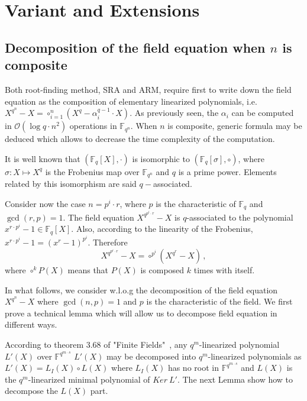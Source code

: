 \documentclass{sig-alternate}
\newcommand{\qq}{q}
\begin{document}


\section{Variant and Extensions}

\subsection{Decomposition of the field equation when $n$ is composite}

\noindent Both root-finding method, SRA and ARM, require first to write down the field equation as the composition of elementary linearized polynomials, i.e. $X^{q^n}-X=\circ_{i=1}^n (X^q-\alpha_i^{q-1} \cdot X)$.
As previously seen, the $\alpha_i$ can be computed in $\mathcal{O}(\log q \cdot n^2)$ operations in $\mathbb{F}_{q^n}$. When $n$ is composite, generic formula may be deduced 
which allows to decrease the time complexity of the computation.

\medskip   

\noindent It is well known that $(\mathbb{F}_q[X],\cdot)$ is isomorphic to  $(\mathbb{F}_q[\sigma], \circ)$, where $\sigma: X \mapsto X^q$ is the Frobenius map over $\mathbb{F}_{q^n}$  and $q$ is a prime power. 
Elements related by this isomorphism are said $q-$associated. 

\medskip

\noindent Consider now the case $n=p^i \cdot r$, where $p$ is the characteristic of $\mathbb{F}_q$ and $\gcd(r,p)=1$.  
The field equation $X^{q^{p^i \cdot r}}-X$ is $q$-associated to the polynomial $x^{r\cdot p^i}-1 \in \mathbb{F}_q[X]$. Also, according
 to the linearity of the Frobenius,  $x^{r \cdot p^i}-1=(x^r-1)^{p^i}$. Therefore 
$$X^{q^{p^i \cdot r}}-X=\circ^{p^i} (X^{q^r}-X)\,,$$
where $\circ^{k} P(X)$ means that $P(X)$ is composed $k$ times with itself. 

\medskip

\noindent In what follows, we consider w.l.o.g the decomposition of the field equation $X^{\qq^n}-X$ where $\gcd(n,p)=1$ and $p$ is the characteristic of the field. We first prove a technical lemma which will allow us to decompose field equation in different ways.

\medskip

According to theorem 3.68 of "Finite Fields"~\cite{LildNiderreiter}, any $\qq^m$-linearized polynomial $L'(X)$ over $\mathbb{F}^{\qq^{m \cdot s}}$ $L'(X)$ may be decomposed into $\qq^m$-linearized polynomials as $L'(X)=L_I(X) \circ L(X)$ where $L_I(X)$ has no root in $\mathbb{F}^{\qq^{m \cdot s}}$ and  $L(X)$ is the $\qq^m$-linearized minimal polynomial of $Ker~L'$. The next Lemma show how to decompose the $L(X)$ part.
\end{document}
